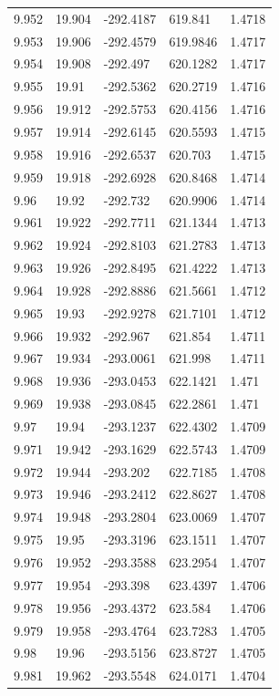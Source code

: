 \begin{tabular}{lllll}
9.952 & 19.904 & -292.4187 & 619.841 & 1.4718 \\
9.953 & 19.906 & -292.4579 & 619.9846 & 1.4717 \\
9.954 & 19.908 & -292.497 & 620.1282 & 1.4717 \\
9.955 & 19.91 & -292.5362 & 620.2719 & 1.4716 \\
9.956 & 19.912 & -292.5753 & 620.4156 & 1.4716 \\
9.957 & 19.914 & -292.6145 & 620.5593 & 1.4715 \\
9.958 & 19.916 & -292.6537 & 620.703 & 1.4715 \\
9.959 & 19.918 & -292.6928 & 620.8468 & 1.4714 \\
9.96 & 19.92 & -292.732 & 620.9906 & 1.4714 \\
9.961 & 19.922 & -292.7711 & 621.1344 & 1.4713 \\
9.962 & 19.924 & -292.8103 & 621.2783 & 1.4713 \\
9.963 & 19.926 & -292.8495 & 621.4222 & 1.4713 \\
9.964 & 19.928 & -292.8886 & 621.5661 & 1.4712 \\
9.965 & 19.93 & -292.9278 & 621.7101 & 1.4712 \\
9.966 & 19.932 & -292.967 & 621.854 & 1.4711 \\
9.967 & 19.934 & -293.0061 & 621.998 & 1.4711 \\
9.968 & 19.936 & -293.0453 & 622.1421 & 1.471 \\
9.969 & 19.938 & -293.0845 & 622.2861 & 1.471 \\
9.97 & 19.94 & -293.1237 & 622.4302 & 1.4709 \\
9.971 & 19.942 & -293.1629 & 622.5743 & 1.4709 \\
9.972 & 19.944 & -293.202 & 622.7185 & 1.4708 \\
9.973 & 19.946 & -293.2412 & 622.8627 & 1.4708 \\
9.974 & 19.948 & -293.2804 & 623.0069 & 1.4707 \\
9.975 & 19.95 & -293.3196 & 623.1511 & 1.4707 \\
9.976 & 19.952 & -293.3588 & 623.2954 & 1.4707 \\
9.977 & 19.954 & -293.398 & 623.4397 & 1.4706 \\
9.978 & 19.956 & -293.4372 & 623.584 & 1.4706 \\
9.979 & 19.958 & -293.4764 & 623.7283 & 1.4705 \\
9.98 & 19.96 & -293.5156 & 623.8727 & 1.4705 \\
9.981 & 19.962 & -293.5548 & 624.0171 & 1.4704 \\

\end{tabular}
